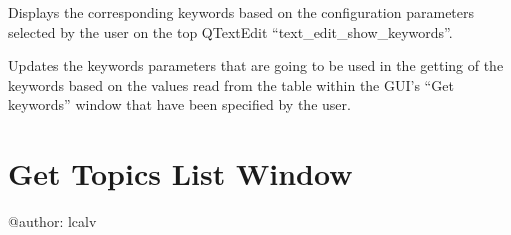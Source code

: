 \documentclass[letterpaper,10pt,english]{sphinxmanual}
\begin{document}
\begin{fulllineitems}

\begin{fulllineitems}
\label{\detokenize{gui_get_keywords_window:src.graphical_user_interface.get_keywords_window.GetKeywordsWindow.show_suggested_keywords}}
\sphinxAtStartPar
Displays the corresponding keywords based on the configuration parameters selected by the user on the top
QTextEdit “text\_edit\_show\_keywords”.

\end{fulllineitems}


\begin{fulllineitems}
\label{\detokenize{gui_get_keywords_window:src.graphical_user_interface.get_keywords_window.GetKeywordsWindow.update_params}}
\sphinxAtStartPar
Updates the keywords parameters that are going to be used in the getting of the keywords based on the
values read from the table within the GUI’s “Get keywords” window that have been specified by the user.

\end{fulllineitems}


\end{fulllineitems}



\chapter{Get Topics List Window}
\label{\detokenize{gui_get_topics_list_window:get-topics-list-window}}\label{\detokenize{gui_get_topics_list_window::doc}}\label{\detokenize{gui_get_topics_list_window:module-src.graphical_user_interface.get_topics_list_window}}
\sphinxAtStartPar
@author: lcalv
\end{document}
